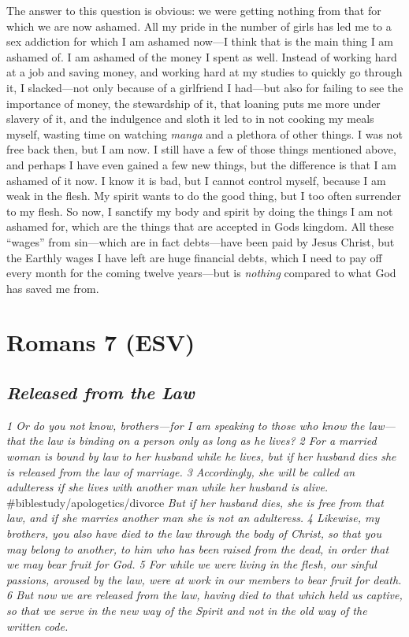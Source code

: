 The answer to this question is obvious: we were getting nothing from
that for which we are now ashamed. All my pride in the number of girls
has led me to a sex addiction for which I am ashamed now---I think that
is the main thing I am ashamed of. I am ashamed of the money I spent as
well. Instead of working hard at a job and saving money, and working
hard at my studies to quickly go through it, I slacked---not only
because of a girlfriend I had---but also for failing to see the
importance of money, the stewardship of it, that loaning puts me more
under slavery of it, and the indulgence and sloth it led to in not
cooking my meals myself, wasting time on watching \emph{manga} and a
plethora of other things. I was not free back then, but I am now. I
still have a few of those things mentioned above, and perhaps I have
even gained a few new things, but the difference is that I am ashamed of
it now. I know it is bad, but I cannot control myself, because I am weak
in the flesh. My spirit wants to do the good thing, but I too often
surrender to my flesh. So now, I sanctify my body and spirit by doing
the things I am not ashamed for, which are the things that are accepted
in Gods kingdom. All these ``wages'' from sin---which are in fact
debts---have been paid by Jesus Christ, but the Earthly wages I have
left are huge financial debts, which I need to pay off every month for
the coming twelve years---but is \emph{nothing} compared to what God has
saved me from.



\hypertarget{romans-7-esv}{%
\section{Romans 7 (ESV)}\label{romans-7-esv}}
\vspace{10.5cm}
\subsection{\emph{Released from the Law}} \emph{1 Or do you not know,
brothers---for I am speaking to those who know the law---that the law is
binding on a person only as long as he lives? 2 For a married woman is
bound by law to her husband while he lives, but if her husband dies she
is released from the law of marriage. 3 Accordingly, she will be
called an adulteress if she lives with another man while her husband is
alive.} \#biblestudy/apologetics/divorce \emph{But if her husband
dies, she is free from that law, and if she marries another man she is
not an adulteress.} \emph{4 Likewise, my brothers, you also have died to
the law through the body of Christ, so that you may belong to another,
to him who has been raised from the dead, in order that we may bear
fruit for God. 5 For while we were living in the flesh, our sinful
passions, aroused by the law, were at work in our members to bear fruit
for death. 6 But now we are released from the law, having died to that
which held us captive, so that we serve in the new way of the Spirit and
not in the old way of the written code.}

